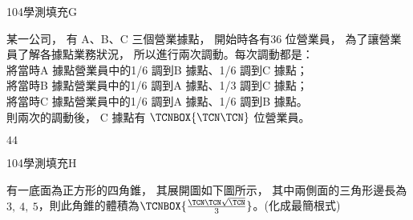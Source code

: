 \begin{QUESTIONS}
    \begin{QUESTION}
        \begin{ExamInfo}{104}{學測}{填充}{G}
        \end{ExamInfo}
        \begin{ExamAnsRateInfo}{46}{81}{47}{10}
        \end{ExamAnsRateInfo}
        \begin{QBODY}
            某一公司， 有 A、B、C 三個營業據點， 開始時各有36 位營業員， 為了讓營業員了解各據點業務狀況， 所以進行兩次調動。每次調動都是：\\
			將當時A 據點營業員中的1/6 調到B 據點、1/6 調到C 據點；\\
			將當時B 據點營業員中的1/6 調到A 據點、1/3 調到C 據點；\\
			將當時C 據點營業員中的1/6 調到A 據點、1/6 調到B 據點。\\
			則兩次的調動後， C 據點有 $\TCNBOX{\TCN\TCN}$ 位營業員。
        \end{QBODY}
        \begin{QFROMS}
        \end{QFROMS}
        \begin{QTAGS}\end{QTAGS}
        \begin{QANS}
            $44$
        \end{QANS}
        \begin{QSOLLIST}
        \end{QSOLLIST}
        \begin{QEMPTYSPACE}
        \end{QEMPTYSPACE}
    \end{QUESTION}
    \begin{QUESTION}
        \begin{ExamInfo}{104}{學測}{填充}{H}
        \end{ExamInfo}
        \begin{ExamAnsRateInfo}{43}{77}{41}{11}
        \end{ExamAnsRateInfo}
        \begin{QBODY}
            有一底面為正方形的四角錐， 其展開圖如下圖所示， 其中兩側面的三角形邊長為 $3,\ 4,\ 5$，則此角錐的體積為$\TCNBOX{\frac{\TCN\TCN\sqrt{\TCN}}{3}}$。(化成最簡根式) 
		

\end{QBODY}
\end{QUESTION}
\end{QUESTIONS}
